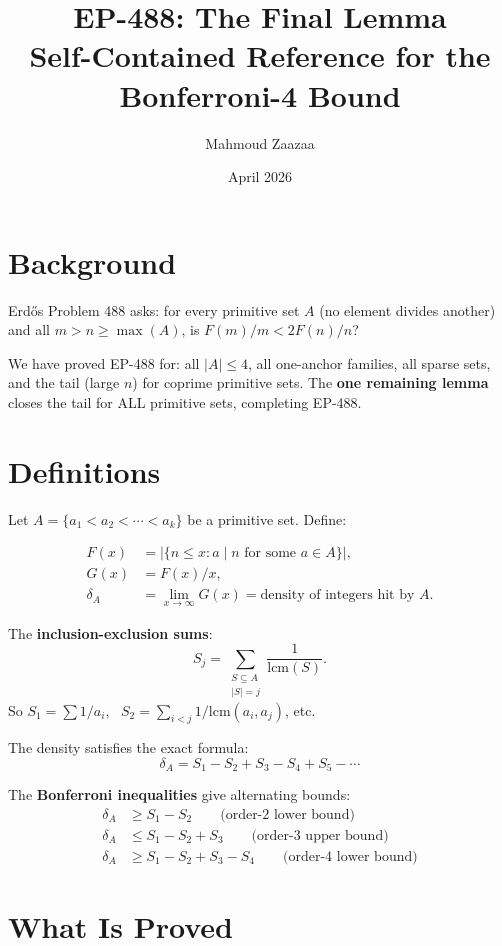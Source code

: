 \documentclass[11pt,a4paper]{article}
\title{EP-488: The Final Lemma\\{\large Self-Contained Reference for the Bonferroni-4 Bound}}
\author{Mahmoud Zaazaa}
\date{April 2026}
\theoremstyle{definition}
\begin{document}
\maketitle

\section{Background}

Erd\H{o}s Problem 488 asks: for every primitive set $A$ (no element
divides another) and all $m > n \geq \max(A)$, is $F(m)/m < 2F(n)/n$?

We have proved EP-488 for: all $|A| \leq 4$, all one-anchor families,
all sparse sets, and the tail (large $n$) for coprime primitive sets.
The \textbf{one remaining lemma} closes the tail for ALL primitive sets,
completing EP-488.

\section{Definitions}

Let $A = \{a_1 < a_2 < \cdots < a_k\}$ be a primitive set. Define:

\begin{align}
F(x) &= |\{n \leq x : a \mid n \text{ for some } a \in A\}|, \\
G(x) &= F(x)/x, \\
\delta_A &= \lim_{x \to \infty} G(x) = \text{density of integers hit by } A.
\end{align}

The \textbf{inclusion-exclusion sums}:
\[
S_j = \sum_{\substack{S \subseteq A \\ |S| = j}} \frac{1}{\mathrm{lcm}(S)}.
\]
So $S_1 = \sum 1/a_i$, \ $S_2 = \sum_{i<j} 1/\mathrm{lcm}(a_i,a_j)$, etc.

The density satisfies the exact formula:
\[
\delta_A = S_1 - S_2 + S_3 - S_4 + S_5 - \cdots
\]

The \textbf{Bonferroni inequalities} give alternating bounds:
\begin{align}
\delta_A &\geq S_1 - S_2 \qquad \text{(order-2 lower bound)} \\
\delta_A &\leq S_1 - S_2 + S_3 \qquad \text{(order-3 upper bound)} \\
\delta_A &\geq S_1 - S_2 + S_3 - S_4 \qquad \text{(order-4 lower bound)}
\end{align}

\section{What Is Proved}
\end{document}
